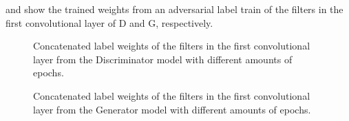 \FloatBarrier
\noindent
{} and  show the trained weights from an adversarial label train of the filters in the first convolutional layer of D and G, respectively.
\begin{figure}[!ht]
  \centering
  \quad
  \caption{Concatenated label weights of the filters in the first convolutional layer from the Discriminator model with different amounts of epochs.}
  \label{fig:nn_adv_label_weights_d}
\end{figure}
\FloatBarrier
\noindent
\begin{figure}[!ht]
  \centering
  \quad
  \caption{Concatenated label weights of the filters in the first convolutional layer from the Generator model with different amounts of epochs.}
  \label{fig:nn_adv_label_weights_g}
\end{figure}
\FloatBarrier
